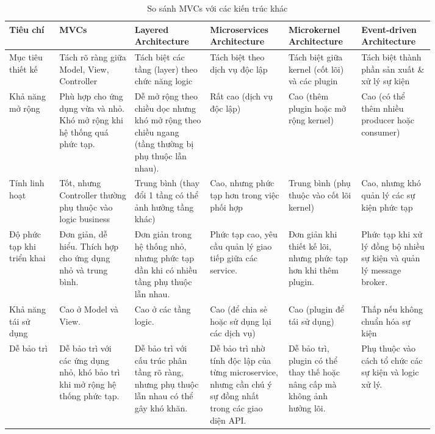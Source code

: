 \begin{table}[H]
    \centering
    \begin{tabular}{|>{\centering\arraybackslash}p{0.1\linewidth}|>{\centering\arraybackslash}p{0.15\linewidth}|>{\centering\arraybackslash}p{0.15\linewidth}|>{\centering\arraybackslash}p{0.15\linewidth}|>{\centering\arraybackslash}p{0.13\linewidth}|>{\centering\arraybackslash}p{0.13\linewidth}|} \hline 
         Tiêu chí&  MVCs&  Layered Architecture&   Microservices Architecture&  Microkernel Architecture& Event-driven Architecture\\ \hline 
         Mục tiêu thiết kế&  Tách rõ ràng giữa Model, View, Controller&  Tách biệt các tầng (layer) theo chức năng logic&  Tách biệt theo dịch vụ độc lập&  Tách biệt giữa kernel (cốt lõi) và các plugin& Tách biệt thành phần sản xuất \& xử lý sự kiện\\ \hline 
         Khả năng mở rộng&  Phù hợp cho ứng dụng vừa và nhỏ. Khó mở rộng khi hệ thống quá phức tạp.&  Dễ mở rộng theo chiều dọc nhưng khó mở rộng theo chiều ngang (tầng thường bị phụ thuộc lẫn nhau).&  Rất cao (dịch vụ độc lập)&  Cao (thêm plugin hoặc mở rộng kernel)& Cao (có thể thêm nhiều producer hoặc consumer)\\ \hline 
         Tính linh hoạt&  Tốt, nhưng Controller thường phụ thuộc vào logic business&  Trung bình (thay đổi 1 tầng có thể ảnh hưởng tầng khác)&  Cao, nhưng phức tạp hơn trong việc phối hợp&  Trung bình (phụ thuộc vào cốt lõi kernel)& Cao, nhưng khó quản lý các sự kiện phức tạp\\ \hline 
         Độ phức tạp khi triển khai&  Đơn giản, dễ hiểu. Thích hợp cho ứng dụng nhỏ và trung bình.&  Đơn giản trong hệ thống nhỏ, nhưng phức tạp dần khi có nhiều tầng phụ thuộc lẫn nhau.&  Phức tạp cao, yêu cầu quản lý giao tiếp giữa các service.&  Đơn giản khi thiết kế lõi, nhưng phức tạp hơn khi thêm plugin.& Phức tạp khi xử lý đồng bộ nhiều sự kiện và quản lý message broker.\\ \hline 
         Khả năng tái sử dụng&  Cao ở Model và View.&  Cao ở các tầng logic.&  Cao (để chia sẻ hoặc sử dụng lại các dịch vụ)&  Cao (plugin để tái sử dụng)& Thấp nếu không chuẩn hóa sự kiện\\ \hline 
         Dễ bảo trì&  Dễ bảo trì với các ứng dụng nhỏ, khó bảo trì khi mở rộng hệ thống phức tạp.&  Dễ bảo trì với cấu trúc phân tầng rõ ràng, nhưng phụ thuộc lẫn nhau có thể gây khó khăn.&  Dễ bảo trì nhờ tính độc lập của từng microservice, nhưng cần chú ý sự đồng nhất trong các giao diện API.&  Dễ bảo trì, plugin có thể thay thế hoặc nâng cấp mà không ảnh hưởng lõi.& Phụ thuộc vào cách tổ chức các sự kiện và logic xử lý.\\ \hline
    \end{tabular}
    \caption{So sánh MVCs với các kiến trúc khác}
    \label{tab:MVCs_comparasion}
\end{table}

